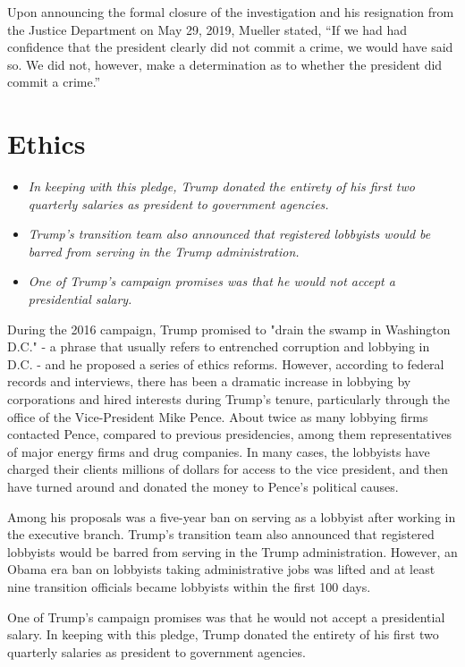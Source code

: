 Upon announcing the formal closure of the investigation and his
resignation from the Justice Department on May 29, 2019, Mueller stated,
``If we had had confidence that the president clearly did not commit a
crime, we would have said so. We did not, however, make a determination
as to whether the president did commit a crime.''

\section{Ethics}\label{ethics}

\begin{itemize}
\item
  \emph{In keeping with this pledge, Trump donated the entirety of his
  first two quarterly salaries as president to government agencies.}
\item
  \emph{Trump's transition team also announced that registered lobbyists
  would be barred from serving in the Trump administration.}
\item
  \emph{One of Trump's campaign promises was that he would not accept a
  presidential salary.}
\end{itemize}

During the 2016 campaign, Trump promised to "drain the swamp in
Washington D.C." - a phrase that usually refers to entrenched corruption
and lobbying in D.C. - and he proposed a series of ethics reforms.
However, according to federal records and interviews, there has been a
dramatic increase in lobbying by corporations and hired interests during
Trump's tenure, particularly through the office of the Vice-President
Mike Pence. About twice as many lobbying firms contacted Pence, compared
to previous presidencies, among them representatives of major energy
firms and drug companies. In many cases, the lobbyists have charged
their clients millions of dollars for access to the vice president, and
then have turned around and donated the money to Pence's political
causes.

Among his proposals was a five-year ban on serving as a lobbyist after
working in the executive branch. Trump's transition team also announced
that registered lobbyists would be barred from serving in the Trump
administration. However, an Obama era ban on lobbyists taking
administrative jobs was lifted and at least nine transition officials
became lobbyists within the first 100 days.

One of Trump's campaign promises was that he would not accept a
presidential salary. In keeping with this pledge, Trump donated the
entirety of his first two quarterly salaries as president to government
agencies.

